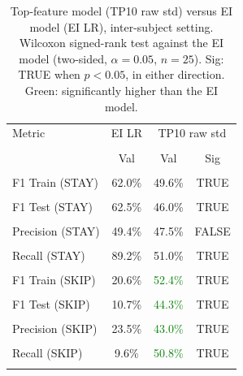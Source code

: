 \begin{table}[H]
\centering
\begin{tabular}{lccc}
\hline
Metric & EI LR & \multicolumn{2}{c}{TP10 raw std} \\\\
 & Val & Val & Sig \\\\
\hline
F1 Train (STAY) & 62.0\% & 49.6\% & TRUE \\\\
F1 Test (STAY) & 62.5\% & 46.0\% & TRUE \\\\
Precision (STAY) & 49.4\% & 47.5\% & FALSE \\\\
Recall (STAY) & 89.2\% & 51.0\% & TRUE \\\\
F1 Train (SKIP) & 20.6\% & \textcolor{green}{52.4\%} & TRUE \\\\
F1 Test (SKIP) & 10.7\% & \textcolor{green}{44.3\%} & TRUE \\\\
Precision (SKIP) & 23.5\% & \textcolor{green}{43.0\%} & TRUE \\\\
Recall (SKIP) & 9.6\% & \textcolor{green}{50.8\%} & TRUE \\\\
\hline
\end{tabular}
\caption{Top-feature model (TP10 raw std) versus EI model (EI LR), inter-subject setting. Wilcoxon signed-rank test against the EI model (two-sided, $\alpha=0.05$, $n=25$). Sig: TRUE when $p<0.05$, in either direction. Green: significantly higher than the EI model.}
\label{tab:metrics_5_inter_3}
\end{table}